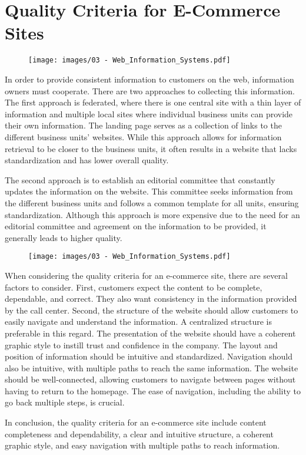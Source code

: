 \section{Quality Criteria for E-Commerce
  Sites}\label{quality-criteria-for-e-commerce-sites}


\begin{figure}[!h]
  \centering
  \texttt{[image: images/03 - Web\_Information\_Systems.pdf]}
\end{figure}

In order to provide consistent information to customers on the web,
information owners must cooperate. There are two approaches to
collecting this information. The first approach is federated, where
there is one central site with a thin layer of information and multiple
local sites where individual business units can provide their own
information. The landing page serves as a collection of links to the
different business units' websites. While this approach allows for
information retrieval to be closer to the business units, it often
results in a website that lacks standardization and has lower overall
quality.

The second approach is to establish an editorial committee that
constantly updates the information on the website. This committee seeks
information from the different business units and follows a common
template for all units, ensuring standardization. Although this approach
is more expensive due to the need for an editorial committee and
agreement on the information to be provided, it generally leads to
higher quality.

\begin{figure}[!h]
  \centering
  \texttt{[image: images/03 - Web\_Information\_Systems.pdf]}
\end{figure}

When considering the quality criteria for an e-commerce site, there are
several factors to consider. First, customers expect the content to be
complete, dependable, and correct. They also want consistency in the
information provided by the call center. Second, the structure of the
website should allow customers to easily navigate and understand the
information. A centralized structure is preferable in this regard. The
presentation of the website should have a coherent graphic style to
instill trust and confidence in the company. The layout and position of
information should be intuitive and standardized. Navigation should also
be intuitive, with multiple paths to reach the same information. The
website should be well-connected, allowing customers to navigate between
pages without having to return to the homepage. The ease of navigation,
including the ability to go back multiple steps, is crucial.

In conclusion, the quality criteria for an e-commerce site include
content completeness and dependability, a clear and intuitive structure,
a coherent graphic style, and easy navigation with multiple paths to
reach information.